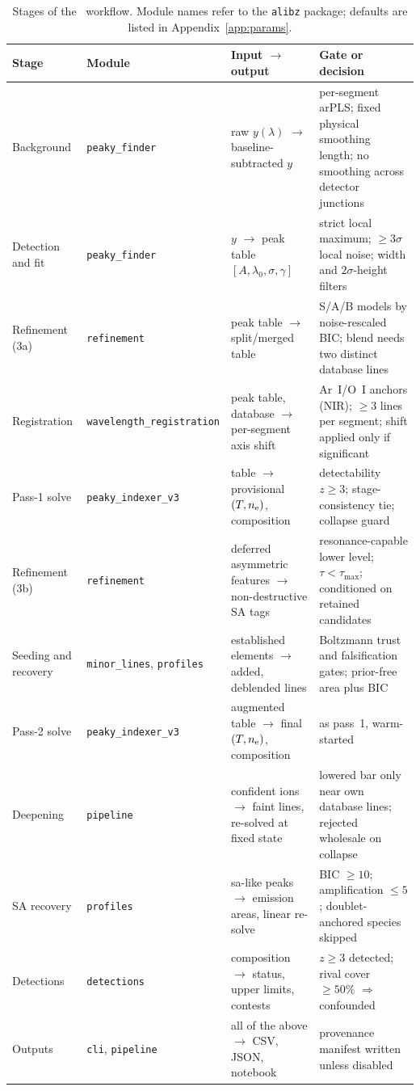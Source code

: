 \begin{table}[t]
\centering
\caption{Stages of the \alibz\ workflow. Module names refer to the \texttt{alibz} package;
defaults are listed in Appendix~\ref{app:params}.}
\label{tab:stages}
\footnotesize
\setlength{\tabcolsep}{4pt}
\begin{tabular}{@{}p{}p{}p{}p{}@{}}
\toprule
Stage & Module & Input $\to$ output & Gate or decision \\
\midrule
Background & \texttt{peaky\_finder} & raw $y(\lambda)$ $\to$ baseline-subtracted $y$ & per-segment arPLS; fixed physical smoothing length; no smoothing across detector junctions \\
Detection and fit & \texttt{peaky\_finder} & $y$ $\to$ peak table $[A,\lambda_0,\sigma,\gamma]$ & strict local maximum; $\ge 3\sigma$ local noise; width and $2\sigma$-height filters \\
Refinement (3a) & \texttt{refinement} & peak table $\to$ split/merged table & S/A/B models by noise-rescaled BIC; blend needs two distinct database lines \\
Registration & \texttt{wavelength\_\allowbreak{}registration} & peak table, database $\to$ per-segment axis shift & Ar~I/O~I anchors (NIR); $\ge 3$ lines per segment; shift applied only if significant \\
Pass-1 solve & \texttt{peaky\_indexer\_v3} & table $\to$ provisional $(T,n_{\mathrm{e}})$, composition & detectability $z\ge 3$; stage-consistency tie; collapse guard \\
Refinement (3b) & \texttt{refinement} & deferred asymmetric features $\to$ non-destructive SA tags & resonance-capable lower level; $\tau<\tau_{\max}$; conditioned on retained candidates \\
Seeding and recovery & \texttt{minor\_lines}, \texttt{profiles} & established elements $\to$ added, deblended lines & Boltzmann trust and falsification gates; prior-free area plus BIC \\
Pass-2 solve & \texttt{peaky\_indexer\_v3} & augmented table $\to$ final $(T,n_{\mathrm{e}})$, composition & as pass~1, warm-started \\
Deepening & \texttt{pipeline} & confident ions $\to$ faint lines, re-solved at fixed state & lowered bar only near own database lines; rejected wholesale on collapse \\
SA recovery & \texttt{profiles} & sa-like peaks $\to$ emission areas, linear re-solve & BIC $\ge 10$; amplification $\le 5$; doublet-anchored species skipped \\
Detections & \texttt{detections} & composition $\to$ status, upper limits, contests & $z\ge 3$ detected; rival cover $\ge 50\%$ $\Rightarrow$ confounded \\
Outputs & \texttt{cli}, \texttt{pipeline} & all of the above $\to$ CSV, JSON, notebook & provenance manifest written unless disabled \\
\bottomrule
\end{tabular}
\end{table}

